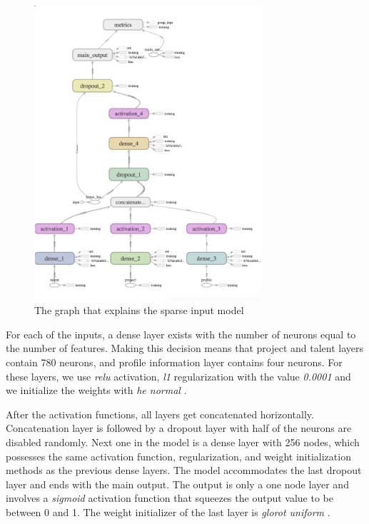 \begin{figure}[htp]
	\centering
	\includegraphics[width=0.75\textwidth]{figures/TensorBoardSparseCropped.png}
	\caption{The graph that explains the sparse input model}
	\label{fig:tensor-board-sparse}
\end{figure}

For each of the inputs, a dense layer exists with the number of neurons equal to the number of features. Making this decision means that project and talent layers contain 780 neurons, and profile information layer contains four neurons. For these layers, we use \textit{relu} activation, \textit{l1} regularization with the value \textit{0.0001} and we initialize the weights with \textit{he normal} \cite{hanin2018start}.


After the activation functions, all layers get concatenated horizontally. Concatenation layer is followed by a dropout layer with half of the neurons are disabled randomly. Next one in the model is a dense layer with 256 nodes, which possesses the same activation function, regularization, and weight initialization methods as the previous dense layers. The model accommodates the last dropout layer and ends with the main output. The output is only a one node layer and involves a \textit{sigmoid} activation function that squeezes the output value to be between 0 and 1. The weight initializer of the last layer is \textit{glorot uniform} \cite{pedamonti2018comparison}.

